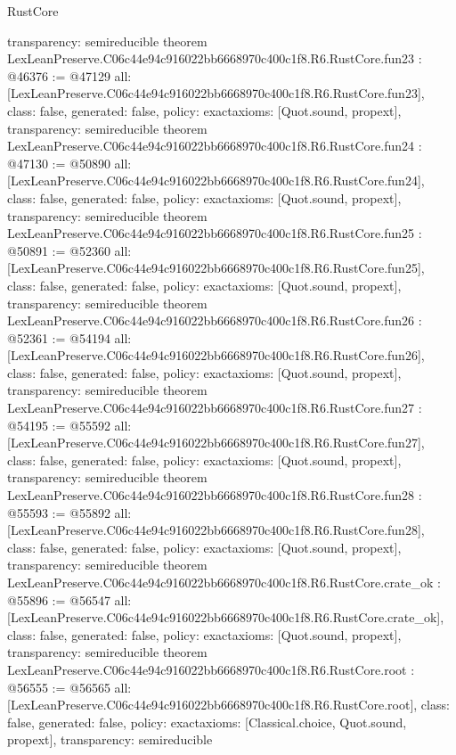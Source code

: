 \begin{lexlean}{RustCore}
\begin{coremodule}
{  transparency: semireducible
}
theorem LexLeanPreserve.C06c44e94c916022bb6668970c400c1f8.R6.RustCore.fun23 : @46376 := @47129 {
  all: [LexLeanPreserve.C06c44e94c916022bb6668970c400c1f8.R6.RustCore.fun23],
  class: false,
  generated: false,
  policy: exact{axioms: [Quot.sound, propext]},
  transparency: semireducible
}
theorem LexLeanPreserve.C06c44e94c916022bb6668970c400c1f8.R6.RustCore.fun24 : @47130 := @50890 {
  all: [LexLeanPreserve.C06c44e94c916022bb6668970c400c1f8.R6.RustCore.fun24],
  class: false,
  generated: false,
  policy: exact{axioms: [Quot.sound, propext]},
  transparency: semireducible
}
theorem LexLeanPreserve.C06c44e94c916022bb6668970c400c1f8.R6.RustCore.fun25 : @50891 := @52360 {
  all: [LexLeanPreserve.C06c44e94c916022bb6668970c400c1f8.R6.RustCore.fun25],
  class: false,
  generated: false,
  policy: exact{axioms: [Quot.sound, propext]},
  transparency: semireducible
}
theorem LexLeanPreserve.C06c44e94c916022bb6668970c400c1f8.R6.RustCore.fun26 : @52361 := @54194 {
  all: [LexLeanPreserve.C06c44e94c916022bb6668970c400c1f8.R6.RustCore.fun26],
  class: false,
  generated: false,
  policy: exact{axioms: [Quot.sound, propext]},
  transparency: semireducible
}
theorem LexLeanPreserve.C06c44e94c916022bb6668970c400c1f8.R6.RustCore.fun27 : @54195 := @55592 {
  all: [LexLeanPreserve.C06c44e94c916022bb6668970c400c1f8.R6.RustCore.fun27],
  class: false,
  generated: false,
  policy: exact{axioms: [Quot.sound, propext]},
  transparency: semireducible
}
theorem LexLeanPreserve.C06c44e94c916022bb6668970c400c1f8.R6.RustCore.fun28 : @55593 := @55892 {
  all: [LexLeanPreserve.C06c44e94c916022bb6668970c400c1f8.R6.RustCore.fun28],
  class: false,
  generated: false,
  policy: exact{axioms: [Quot.sound, propext]},
  transparency: semireducible
}
theorem LexLeanPreserve.C06c44e94c916022bb6668970c400c1f8.R6.RustCore.crate_ok : @55896 := @56547 {
  all: [LexLeanPreserve.C06c44e94c916022bb6668970c400c1f8.R6.RustCore.crate_ok],
  class: false,
  generated: false,
  policy: exact{axioms: [Quot.sound, propext]},
  transparency: semireducible
}
theorem LexLeanPreserve.C06c44e94c916022bb6668970c400c1f8.R6.RustCore.root : @56555 := @56565 {
  all: [LexLeanPreserve.C06c44e94c916022bb6668970c400c1f8.R6.RustCore.root],
  class: false,
  generated: false,
  policy: exact{axioms: [Classical.choice, Quot.sound, propext]},
  transparency: semireducible
}


\end{coremodule}
\end{lexlean}
